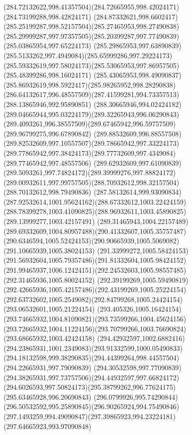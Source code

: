 {{\curveto(284.72132622,998.41357504)(284.72665955,998.42024171)(284.73199288,998.42824171)
\curveto(284.87332621,998.6602417)(285.25199287,998.52157504)(285.27465953,998.27490838)
\curveto(285.29999287,997.97357505)(285.20399287,997.77490839)(285.03865954,997.65224173)
\curveto(285.29865953,997.63890839)(285.5133262,997.4949084)(285.65999286,997.29224173)
\curveto(285.59332619,997.58024173)(285.53065953,997.86957505)(285.48399286,998.16024171)
\curveto(285.43065953,998.49090837)(285.86932619,998.5922417)(285.98265952,998.28290838)
\curveto(286.64132617,996.48557509)(287.41599281,994.73357513)(288.13865946,992.95890851)
\curveto(288.30665946,994.02424182)(289.04665944,995.03224179)(289.32265943,996.06290843)
\curveto(289.4093261,996.38557509)(289.67465942,996.59757509)(289.96799275,996.67890842)
\curveto(289.88532609,996.88557508)(289.82532609,997.10557507)(289.78665942,997.33224173)
\curveto(289.77865942,997.38424173)(289.77732609,997.4349084)(289.77465942,997.48557506)
\curveto(289.62932609,997.61090839)(289.5093261,997.74824172)(289.39999276,997.88824172)
\curveto(289.00932611,997.99757505)(288.70932612,998.32157504)(288.70132612,998.79490836)
\curveto(287.58132614,999.93090834)(287.92532614,1001.95624162)(288.67332612,1003.22424159)
\curveto(288.78399278,1003.41090825)(288.96932611,1003.45890825)(289.13999277,1003.42157491)
\curveto(289.31465943,1004.22157489)(289.69332609,1004.80957488)(290.41332607,1005.35757487)
\curveto(290.6346594,1005.52424153)(290.90665939,1005.5069082)(291.10665939,1005.38024153)
\curveto(291.33999272,1005.58424153)(291.56932604,1005.79357486)(291.81332604,1005.98424152)
\curveto(291.99465937,1006.12424151)(292.24532603,1005.98557485)(292.31465936,1005.80024152)
\curveto(292.39199269,1005.59490819)(292.42665936,1005.42157486)(292.43199269,1005.25224154)
\curveto(292.63732602,1005.2549082)(292.84799268,1005.24424154)(293.06532601,1005.21224154)
\curveto(293.405326,1005.16424154)(293.74665932,1004.81090821)(293.73599266,1004.45624156)
\curveto(293.72665932,1004.11224156)(293.70799266,1003.76690824)(293.68665932,1003.42424158)
\curveto(294.42932597,1002.6882416)(294.23865931,1001.2349083)(293.91332599,1000.05490833)
\curveto(294.18132598,999.38290835)(294.44399264,998.44557504)(294.22665931,997.79090839)
\curveto(294.30532598,997.77090839)(294.38265931,997.73757506)(294.44932597,997.66824172)
\curveto(294.6026593,997.50824173)(295.38799262,996.77624175)(295.63465928,996.20690843)
\curveto(296.0799926,995.74290844)(296.50532592,995.25890845)(296.90265924,994.75490846)
\curveto(297.1493259,994.49090847)(297.39865923,994.23224181)(297.64665923,993.97090848)
}}
